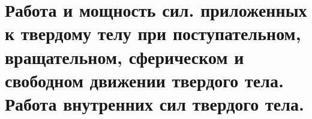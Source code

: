 \chapter{Работа и мощность сил. приложенных к твердому телу при поступательном,
вращательном, сферическом и свободном движении твердого тела. Работа
внутренних сил твердого тела.}

\newpage
